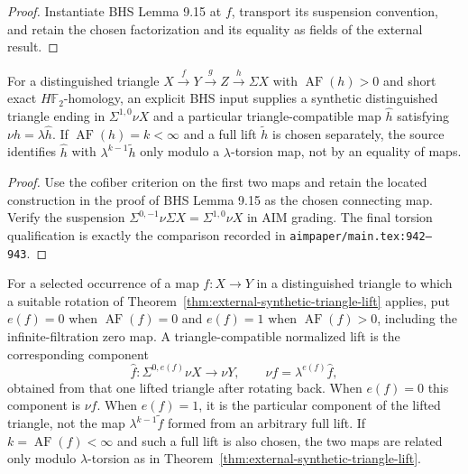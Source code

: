 \begin{proof}
  Instantiate BHS Lemma 9.15 at $f$, transport its suspension convention, and
  retain the chosen factorization and its equality as fields of the external
  result.
\end{proof}

\begin{theorem}
  \label{thm:external-synthetic-triangle-lift}
  \notready
  For a distinguished triangle
  $X\xrightarrow fY\xrightarrow gZ\xrightarrow h\Sigma X$ with
  $\operatorname{AF}(h)>0$ and short exact $H\mathbb F_2$-homology, an
  explicit BHS input supplies a synthetic distinguished triangle ending in
  $\Sigma^{1,0}\nu X$ and a particular triangle-compatible map $\widehat h$
  satisfying $\nu h=\lambda\widehat h$.  If
  $\operatorname{AF}(h)=k<\infty$ and a full lift $\widetilde h$ is chosen
  separately, the source identifies $\widehat h$ with
  $\lambda^{k-1}\widetilde h$ only modulo a $\lambda$-torsion map, not by an
  equality of maps.
\end{theorem}

\begin{proof}
  Use the cofiber criterion on the first two maps and retain the located
  construction in the proof of BHS Lemma 9.15 as the chosen connecting map.
  Verify the suspension
  $\Sigma^{0,-1}\nu\Sigma X=\Sigma^{1,0}\nu X$ in AIM grading.  The final
  torsion qualification is exactly the comparison recorded in
  \texttt{aimpaper/main.tex:942--943}.
\end{proof}

\begin{definition}
  \label{def:synthetic-hat-map}
  \notready
  For a selected occurrence of a map $f:X\to Y$ in a distinguished triangle
  to which a suitable rotation of
  Theorem~\ref{thm:external-synthetic-triangle-lift} applies, put $e(f)=0$ when
  $\operatorname{AF}(f)=0$ and $e(f)=1$ when
  $\operatorname{AF}(f)>0$, including the infinite-filtration zero map.  A
  triangle-compatible normalized lift is the corresponding component
  \[
    \widehat f:\Sigma^{0,e(f)}\nu X\longrightarrow\nu Y,
    \qquad \nu f=\lambda^{e(f)}\widehat f,
  \]
  obtained from that one lifted triangle after rotating back.  When $e(f)=0$
  this component is $\nu f$.  When $e(f)=1$, it is the particular component of
  the lifted triangle, not the map $\lambda^{k-1}\widetilde f$ formed from an
  arbitrary full lift.  If $k=\operatorname{AF}(f)<\infty$ and such a full lift
  is also chosen, the two maps are related only modulo $\lambda$-torsion as in
  Theorem~\ref{thm:external-synthetic-triangle-lift}.
\end{definition}

